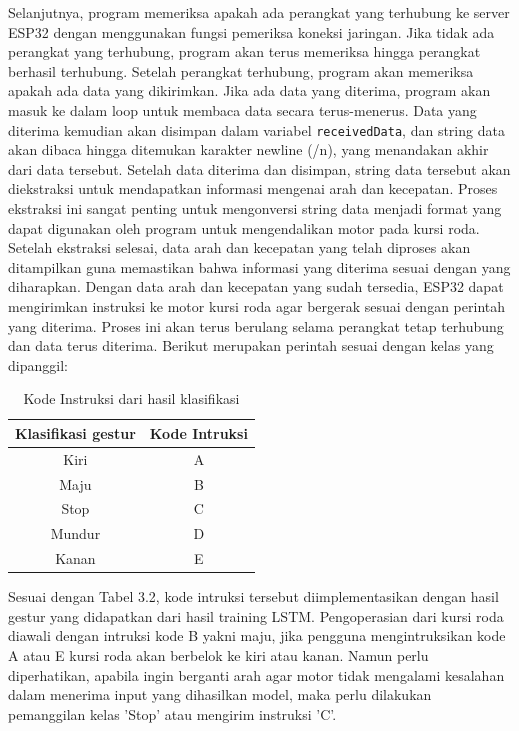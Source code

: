 Selanjutnya, program memeriksa apakah ada perangkat yang terhubung ke server ESP32 dengan menggunakan fungsi pemeriksa koneksi jaringan. Jika tidak ada perangkat yang terhubung, program akan terus memeriksa hingga perangkat berhasil terhubung. Setelah perangkat terhubung, program akan memeriksa apakah ada data yang dikirimkan. Jika ada data yang diterima, program akan masuk ke dalam loop untuk membaca data secara terus-menerus. Data yang diterima kemudian akan disimpan dalam variabel \texttt{receivedData}, dan string data akan dibaca hingga ditemukan karakter newline (/n), yang menandakan akhir dari data tersebut.
Setelah data diterima dan disimpan, string data tersebut akan diekstraksi untuk mendapatkan informasi mengenai arah dan kecepatan. Proses ekstraksi ini sangat penting untuk mengonversi string data menjadi format yang dapat digunakan oleh program untuk mengendalikan motor pada kursi roda. Setelah ekstraksi selesai, data arah dan kecepatan yang telah diproses akan ditampilkan guna memastikan bahwa informasi yang diterima sesuai dengan yang diharapkan. Dengan data arah dan kecepatan yang sudah tersedia, ESP32 dapat mengirimkan instruksi ke motor kursi roda agar bergerak sesuai dengan perintah yang diterima. Proses ini akan terus berulang selama perangkat tetap terhubung dan data terus diterima. Berikut merupakan perintah sesuai dengan kelas yang dipanggil:

\begin{table}[H]
    \centering
    \begin{tabular}{|c|c|}
    \hline
    \textbf{Klasifikasi gestur} & \textbf{Kode Intruksi} \\ \hline
    Kiri & A \\ \hline
    Maju & B \\ \hline
    Stop & C \\ \hline
    Mundur & D \\ \hline
    Kanan & E \\ \hline
    \end{tabular}
    \caption{Kode Instruksi dari hasil klasifikasi}
    \label{tab:kode intruksi}
\end{table}

Sesuai dengan Tabel 3.2, kode intruksi tersebut diimplementasikan dengan hasil gestur yang didapatkan dari hasil training LSTM. Pengoperasian dari kursi roda diawali dengan intruksi kode B yakni maju, jika pengguna mengintruksikan kode A atau E kursi roda akan berbelok ke kiri atau kanan. Namun perlu diperhatikan, apabila ingin berganti arah agar motor tidak mengalami kesalahan dalam menerima input yang dihasilkan model, maka perlu dilakukan pemanggilan kelas ’Stop’ atau mengirim instruksi ’C’.
